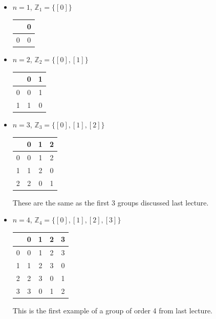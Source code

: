 \documentclass{article}
\theoremstyle{definition}
\begin{document}
\begin{itemize}
    \item $n=1$, $\mathbb{Z}_1=\{[0]\}$
    \begin{table}[H]
        \centering
        \begin{tabular}{c|c}
            &0\\
            \hline
            0&0
        \end{tabular}
    \end{table}

    \item $n=2$, $\mathbb{Z}_2=\{[0],[1]\}$

    \begin{table}[H]
        \centering
        \begin{tabular}{c|cc}
            &0&1\\
            \hline
            0&0&1\\
            1&1&0
        \end{tabular}
    \end{table}

    \item $n=3$, $\mathbb{Z}_3=\{[0],[1],[2]\}$
    \begin{table}[H]
        \centering
        \begin{tabular}{c|ccc}
            &0&1&2\\
            \hline
            0&0&1&2\\
            1&1&2&0\\
            2&2&0&1
        \end{tabular}
    \end{table}


    These are the same as the first 3 groups discussed last lecture.

    \item $n=4$, $\mathbb{Z}_4=\{[0],[1],[2],[3]\}$

    \begin{table}[H]
        \centering
        \begin{tabular}{c|cccc}
            &0&1&2&3\\
            \hline
            0&0&1&2&3\\
            1&1&2&3&0\\
            2&2&3&0&1\\
            3&3&0&1&2
        \end{tabular}
    \end{table}
    This is the first example of a group of order 4 from last lecture.
\end{itemize}
\end{document}
